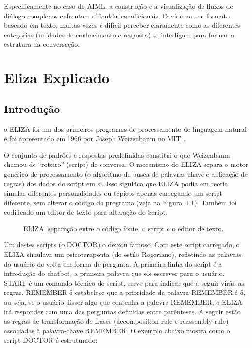 \documentclass[a4paper,oneside]{book}
\begin{document}
Especificamente no caso do AIML, a construção e a visualização de fluxos de diálogo complexos enfrentam dificuldades adicionais. Devido ao seu formato baseado em texto, muitas vezes é difícil perceber claramente como as diferentes categorias (unidades de conhecimento e resposta) se interligam para formar a estrutura da conversação.


\chapter{Eliza Explicado}

\section{Introdução}

o ELIZA foi um dos primeiros programas de processamento de linguagem natural e foi apresentado em 1966 por Joseph Weizenbaum no MIT \cite{Weizenbaum1996}.

O conjunto de padrões e respostas predefinidas constitui o que Weizenbaum chamou de “roteiro” (script) de conversa. O mecanismo do ELIZA separa o motor genérico de processamento (o algoritmo de busca de palavras-chave e aplicação de regras) dos dados do script em si. Isso significa que ELIZA podia em teoria simular diferentes personalidades ou tópicos apenas carregando um script diferente, sem alterar o código do programa (veja na Figura~\ref{fig:elizaeditor}). Também foi codificado um editor de texto para alteração do Script.

\begin{figure}[!htbp]
	\centering	
	\caption{ELIZA: separação entre o código fonte, o script e o editor de texto.}
	\label{fig:elizaeditor}
\end{figure}

Um destes scripts (o DOCTOR) o deixou famoso. Com este script carregado, o ELIZA simulava um psicoterapeuta (do estilo Rogeriano), refletindo as palavras do usuário de volta em forma de pergunta. A primeira linha do script é a introdução do chatbot, a primeira palavra que ele escrever para o usuário. START é um comando técnico do script, serve para indicar que a seguir virão as regras. REMEMBER 5 estabelece que a prioridade da palavra REMEMBER é 5, ou seja, se o usuário disser algo que contenha a palavra REMEMBER, o ELIZA irá responder com uma das perguntas definidas entre parênteses. A seguir estão as regras de transformação de frases (decomposition rule e reassembly rule) associadas à palavra-chave REMEMBER. O exemplo abaixo mostra como o script DOCTOR é estruturado:
\end{document}

